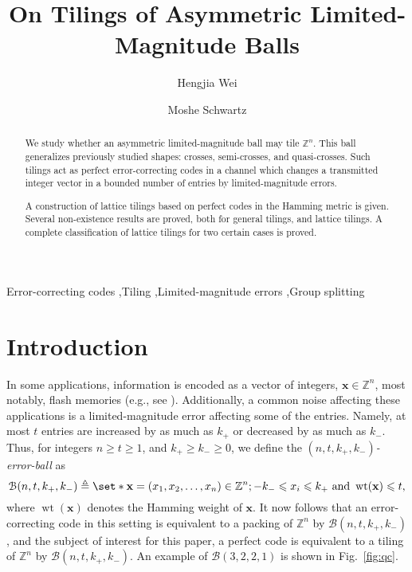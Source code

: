 \documentclass[sort&compress]{elsarticle}
\newcommand{\cB}{\mathcal{B}}
\renewcommand{\leq}{\leqslant}
\renewcommand{\geq}{\geqslant}
\newcommand{\Z}{\mathbb{Z}}
\newcommand{\vx}{\mathbf{x}}
\DeclareMathOperator{\wt}{wt}
\newcommand{\kp}{k_+}
\newcommand{\km}{k_-}
\newcommand{\BALL}{{\mathcal B}(n,t,\kp,\km)}
\begin{document}
\title{On Tilings of Asymmetric Limited-Magnitude Balls}
\author[1]{Hengjia Wei}

\author[2]{Moshe Schwartz}

\address[1]{School of Electrical and Computer Engineering,
  Ben-Gurion University of the Negev,\\
  Beer Sheva 8410501, Israel}
\address[2]{
  School of Electrical and Computer Engineering,
  Ben-Gurion University of the Negev,\\
  Beer Sheva 8410501, Israel}

\begin{abstract}
  We study whether an asymmetric limited-magnitude ball may tile
  $\Z^n$. This ball generalizes previously studied shapes: crosses,
  semi-crosses, and quasi-crosses. Such tilings act as perfect
  error-correcting codes in a channel which changes a transmitted
  integer vector in a bounded number of entries by limited-magnitude
  errors.

  A construction of lattice tilings based on perfect codes in the
  Hamming metric is given. Several non-existence results are proved,
  both for general tilings, and lattice tilings. A complete
  classification of lattice tilings for two certain cases is proved.
\end{abstract}

\begin{keyword}
  Error-correcting codes \sep Tiling \sep Limited-magnitude errors \sep Group splitting
\end{keyword}
\maketitle


\section{Introduction}

In some applications, information is encoded as a vector of integers,
$\vx\in\Z^n$, most notably, flash memories (e.g., see
\cite{CasSchBohBru10}). Additionally, a common noise affecting these
applications is a limited-magnitude error affecting some of the
entries. Namely, at most $t$ entries are increased by as much as $\kp$
or decreased by as much as $\km$. Thus, for integers $n\geq t\geq 1$, and
$\kp\geq \km\geq 0$, we define the \emph{$(n,t,\kp,\km)$-error-ball}
as
\[\BALL\triangleq \set*{\vx=(x_1,x_2,\ldots,x_n)\in \Z^n ; -\km \leq x_i \leq \kp \text{ and  } \wt(\vx) \leq t  },\]
where $\wt(\vx)$ denotes the Hamming weight of $\vx$. It now follows
that an error-correcting code in this setting is equivalent to a
packing of $\Z^n$ by $\BALL$, and the subject of interest for this
paper, a perfect code is equivalent to a tiling of $\Z^n$ by $\BALL$.
An example of $\cB(3,2,2,1)$ is shown in Fig.~\ref{fig:qc}.
\end{document}
